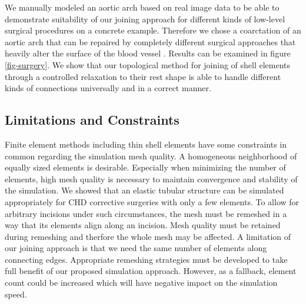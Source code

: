 We manually modeled an aortic arch based on real image data to be able to demonstrate suitability of our joining approach for different kinds of low-level surgical procedures on a concrete example. Therefore we chose a coarctation of an aortic arch that can be repaired by completely different surgical approaches that heavily alter the surface of the blood vessel \cite{Dodge2000}. Results can be examined in figure \ref{fig-surgery}. We show that our topological method for joining of shell elements through a controlled relaxation to their rest shape is able to handle different kinds of connections universally and in a correct manner.

\subsection{Limitations and Constraints}

Finite element methods including thin shell elements have some constraints in common regarding the simulation mesh quality. A homogeneous neighborhood of equally sized elements is desirable. Especially when minimizing the number of elements, high mesh quality is necessary to maintain convergence and stability of the simulation. We showed that an elastic tubular structure can be simulated appropriately for CHD corrective surgeries with only a few elements. To allow for arbitrary incisions under such circumstances, the mesh must be remeshed in a way that its elements align along an incision. Mesh quality must be retained during remeshing and therfore the whole mesh may be affected. A limitation of our joining approach is that we need the same number of elements along connecting edges. Appropriate remeshing strategies must be developed to take full benefit of our proposed simulation approach. However, as a fallback, element count could be increased which will have negative impact on the simulation speed.

